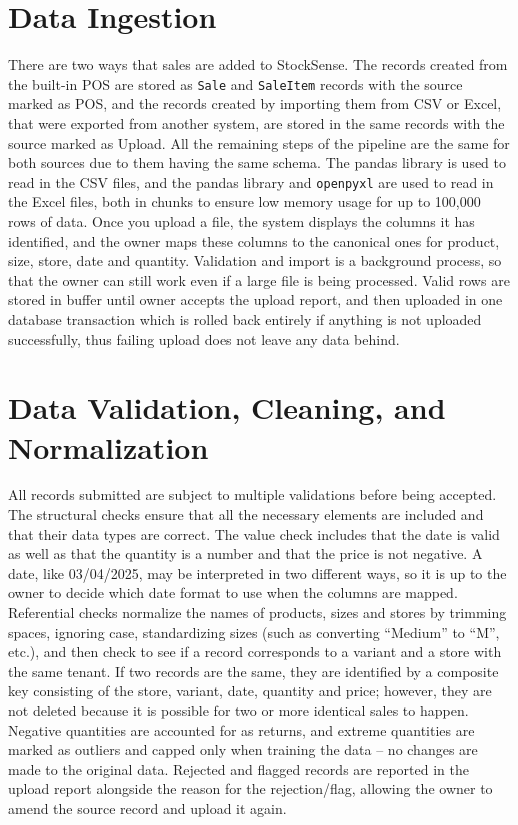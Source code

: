 \documentclass{StockSense}
\begin{document}
\section{Data Ingestion}
\label{sec:ingestion}

There are two ways that sales are added to StockSense. The records created from the built-in POS are stored as \texttt{Sale} and \texttt{SaleItem} records with the source marked as POS, and the records created by importing them from CSV or Excel, that were exported from another system, are stored in the same records with the source marked as Upload. All the remaining steps of the pipeline are the same for both sources due to them having the same schema. The pandas library is used to read in the CSV files, and the pandas library and \texttt{openpyxl} are used to read in the Excel files, both in chunks to ensure low memory usage for up to 100,000 rows of data. Once you upload a file, the system displays the columns it has identified, and the owner maps these columns to the canonical ones for product, size, store, date and quantity. Validation and import is a background process, so that the owner can still work even if a large file is being processed. Valid rows are stored in buffer until owner accepts the upload report, and then uploaded in one database transaction which is rolled back entirely if anything is not uploaded successfully, thus failing upload does not leave any data behind.

\section{Data Validation, Cleaning, and Normalization}
\label{sec:validation}

All records submitted are subject to multiple validations before being accepted. The structural checks ensure that all the necessary elements are included and that their data types are correct. The value check includes that the date is valid as well as that the quantity is a number and that the price is not negative. A date, like 03/04/2025, may be interpreted in two different ways, so it is up to the owner to decide which date format to use when the columns are mapped. Referential checks normalize the names of products, sizes and stores by trimming spaces, ignoring case, standardizing sizes (such as converting ``Medium'' to ``M'', etc.), and then check to see if a record corresponds to a variant and a store with the same tenant. If two records are the same, they are identified by a composite key consisting of the store, variant, date, quantity and price; however, they are not deleted because it is possible for two or more identical sales to happen. Negative quantities are accounted for as returns, and extreme quantities are marked as outliers and capped only when training the data – no changes are made to the original data. Rejected and flagged records are reported in the upload report alongside the reason for the rejection/flag, allowing the owner to amend the source record and upload it again.
\end{document}

